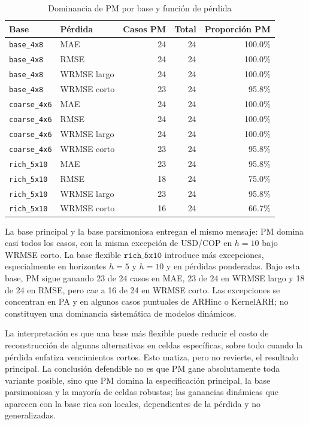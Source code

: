 \documentclass[a4paper,11pt]{article}
\begin{document}
\begin{table}[H]
\centering
\caption{Dominancia de PM por base y función de pérdida}
\label{tab:basis_robustness}
\scriptsize
\begin{tabular}{llrrr}
\toprule
Base & Pérdida & Casos PM & Total & Proporción PM \\
\midrule
\texttt{base\_4x8} & MAE & 24 & 24 & 100.0\% \\
\texttt{base\_4x8} & RMSE & 24 & 24 & 100.0\% \\
\texttt{base\_4x8} & WRMSE largo & 24 & 24 & 100.0\% \\
\texttt{base\_4x8} & WRMSE corto & 23 & 24 & 95.8\% \\
\texttt{coarse\_4x6} & MAE & 24 & 24 & 100.0\% \\
\texttt{coarse\_4x6} & RMSE & 24 & 24 & 100.0\% \\
\texttt{coarse\_4x6} & WRMSE largo & 24 & 24 & 100.0\% \\
\texttt{coarse\_4x6} & WRMSE corto & 23 & 24 & 95.8\% \\
\texttt{rich\_5x10} & MAE & 23 & 24 & 95.8\% \\
\texttt{rich\_5x10} & RMSE & 18 & 24 & 75.0\% \\
\texttt{rich\_5x10} & WRMSE largo & 23 & 24 & 95.8\% \\
\texttt{rich\_5x10} & WRMSE corto & 16 & 24 & 66.7\% \\
\bottomrule
\end{tabular}
\end{table}

La base principal y la base parsimoniosa entregan el mismo mensaje: PM domina casi todos los casos, con la misma excepción de USD/COP en \(h=10\) bajo WRMSE corto. La base flexible \(\texttt{rich\_5x10}\) introduce más excepciones, especialmente en horizontes \(h=5\) y \(h=10\) y en pérdidas ponderadas. Bajo esta base, PM sigue ganando 23 de 24 casos en MAE, 23 de 24 en WRMSE largo y 18 de 24 en RMSE, pero cae a 16 de 24 en WRMSE corto. Las excepciones se concentran en PA y en algunos casos puntuales de ARHinc o KernelARH; no constituyen una dominancia sistemática de modelos dinámicos.

La interpretación es que una base más flexible puede reducir el costo de reconstrucción de algunas alternativas en celdas específicas, sobre todo cuando la pérdida enfatiza vencimientos cortos. Esto matiza, pero no revierte, el resultado principal. La conclusión defendible no es que PM gane absolutamente toda variante posible, sino que PM domina la especificación principal, la base parsimoniosa y la mayoría de celdas robustas; las ganancias dinámicas que aparecen con la base rica son locales, dependientes de la pérdida y no generalizadas.
\end{document}
